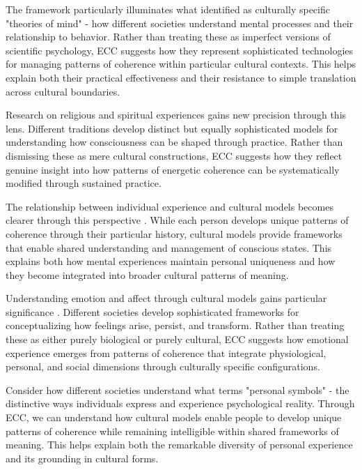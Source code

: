 \begin{refsection}
The framework particularly illuminates what \cite{levy1973tahitians} identified as culturally specific "theories of mind" - how different societies understand mental processes and their relationship to behavior. Rather than treating these as imperfect versions of scientific psychology, ECC suggests how they represent sophisticated technologies for managing patterns of coherence within particular cultural contexts. This helps explain both their practical effectiveness and their resistance to simple translation across cultural boundaries.

Research on religious and spiritual experiences \cite{luhrmann2012when} gains new precision through this lens. Different traditions develop distinct but equally sophisticated models for understanding how consciousness can be shaped through practice. Rather than dismissing these as mere cultural constructions, ECC suggests how they reflect genuine insight into how patterns of energetic coherence can be systematically modified through sustained practice.

The relationship between individual experience and cultural models becomes clearer through this perspective \cite{white1994ethnopsychology}. While each person develops unique patterns of coherence through their particular history, cultural models provide frameworks that enable shared understanding and management of conscious states. This explains both how mental experiences maintain personal uniqueness and how they become integrated into broader cultural patterns of meaning.

Understanding emotion and affect through cultural models gains particular significance \cite{wikan1990managing}. Different societies develop sophisticated frameworks for conceptualizing how feelings arise, persist, and transform. Rather than treating these as either purely biological or purely cultural, ECC suggests how emotional experience emerges from patterns of coherence that integrate physiological, personal, and social dimensions through culturally specific configurations.

Consider how different societies understand what \cite{obeyesekere1981medusa} terms "personal symbols" - the distinctive ways individuals express and experience psychological reality. Through ECC, we can understand how cultural models enable people to develop unique patterns of coherence while remaining intelligible within shared frameworks of meaning. This helps explain both the remarkable diversity of personal experience and its grounding in cultural forms.


\end{refsection}
